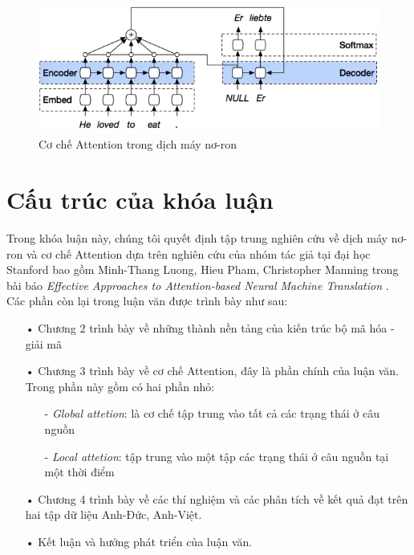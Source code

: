 \begin{figure}
	\centering
	\includegraphics[width=\textwidth]{intro2attention}
	\caption[Cơ chế Attention trong dịch máy nơ-ron]{Cơ chế Attention trong dịch máy nơ-ron}
	\label{fig_intronmt}
\end{figure} 

\section{Cấu trúc của khóa luận}
Trong khóa luận này, chúng tôi quyết định tập trung nghiên cứu về dịch máy nơ-ron và cơ chế Attention dựa trên nghiên cứu của nhóm tác giả tại đại học Stanford bao gồm Minh-Thang Luong, Hieu Pham, Christopher Manning trong bài báo \textit{Effective Approaches to Attention-based Neural Machine Translation} \cite{mainpaper}. Các phần còn lại trong luận văn được trình bày như sau:

\begin{itemize}
	\item[•] Chương 2 trình bày về những thành nền tảng của kiến trúc bộ mã hóa - giải mã
	
	\item[•] Chương 3 trình bày về cơ chế Attention, đây là phần chính của luận văn. Trong phần này gồm có hai phần nhỏ:
		\begin{itemize}
			\item[-] \textit{Global attetion}: là cơ chế tập trung vào tất cả các trạng thái ở câu nguồn
			\item[-] \textit{Local attetion}: tập trung vào một tập các trạng thái ở câu nguồn tại một thời điểm
		\end{itemize}
	\item[•] Chương 4 trình bày về các thí nghiệm và các phân tích về kết quả đạt trên hai tập dữ liệu Anh-Đức, Anh-Việt.
	\item[•] Kết luận và hướng phát triển của luận văn.
\end{itemize}





